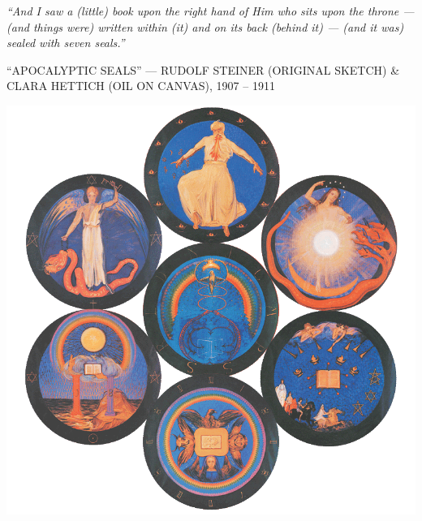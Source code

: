 \clearpage
\thispagestyle{empty}
\null\vfill
\settowidth{}
\begin{center}
\parbox{\longest}{%
  \raggedright{\huge\itshape%
    ``And I saw a (little) book upon the right hand of Him who sits upon the throne — (and things were) written within (it) and on its back (behind it) — (and it was) sealed with seven seals.'' \par\bigskip
  }
  \raggedleft\Large\MakeUppercase{``Apocalyptic Seals'' — Rudolf Steiner (original sketch) \& Clara Hettich (oil on canvas), 1907 – 1911}\par%
}
\vfill\vfill
\clearpage\newpage
\end{center}
\newpage
\thispagestyle{empty}
\begin{center}
	\includegraphics[width=1\textwidth]{images/illustrations/steinerapocalypticseals.png}
\end{center}